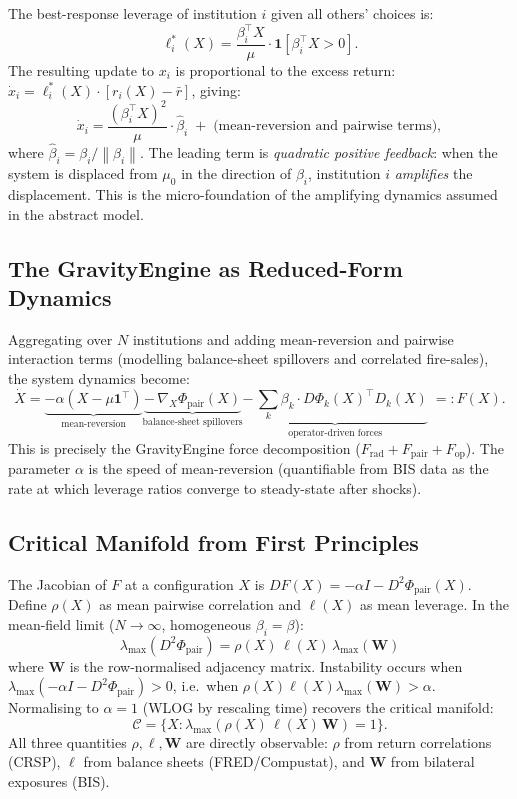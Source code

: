 \documentclass[11pt]{article}
\theoremstyle{definition}
\newcommand{\grad}{\nabla}
\newcommand{\Cman}{\mathcal{C}}
\newcommand{\lmax}{\lambda_{\max}}
\newcommand{\norm}[1]{\left\|#1\right\|}
\begin{document}
The best-response leverage of institution $i$ given all others' choices is:
\[
  \ell_i^*(X) = \frac{\beta_i^\top X}{\mu} \cdot \mathbf{1}[\beta_i^\top X > 0].
\]
The resulting update to $x_i$ is proportional to the excess return:
$\dot x_i = \ell_i^*(X) \cdot [r_i(X) - \bar r]$, giving:
\begin{equation}\label{eq:micro_dynamics}
  \dot x_i = \frac{(\beta_i^\top X)^2}{\mu} \cdot \hat\beta_i
  \;+\; \text{(mean-reversion and pairwise terms)},
\end{equation}
where $\hat\beta_i = \beta_i/\norm{\beta_i}$.
The leading term is \emph{quadratic positive feedback}: when the system is displaced
from $\mu_0$ in the direction of $\beta_i$, institution $i$ \emph{amplifies} the
displacement.  This is the micro-foundation of the amplifying dynamics assumed in
the abstract model.

\subsection{The GravityEngine as Reduced-Form Dynamics}

Aggregating over $N$ institutions and adding mean-reversion and pairwise interaction
terms (modelling balance-sheet spillovers and correlated fire-sales), the system
dynamics become:
\begin{equation}\label{eq:full_dynamics}
  \dot X = \underbrace{-\alpha(X - \mu\mathbf{1}^\top)}_{\text{mean-reversion}}
           \underbrace{-\, \grad_X \Phi_{\mathrm{pair}}(X)}_{\text{balance-sheet spillovers}}
           \underbrace{-\, \sum_k \beta_k \cdot D\Phi_k(X)^\top D_k(X)}_{\text{operator-driven forces}}
           \;=: F(X).
\end{equation}
This is precisely the GravityEngine force decomposition ($F_{\mathrm{rad}} + F_{\mathrm{pair}} + F_{\mathrm{op}}$).
The parameter $\alpha$ is the speed of mean-reversion (quantifiable from BIS data as
the rate at which leverage ratios converge to steady-state after shocks).

\subsection{Critical Manifold from First Principles}

The Jacobian of $F$ at a configuration $X$ is $DF(X) = -\alpha I - D^2\Phi_{\mathrm{pair}}(X)$.
Define $\rho(X)$ as mean pairwise correlation and $\ell(X)$ as mean leverage.
In the mean-field limit ($N \to \infty$, homogeneous $\beta_i = \beta$):
\[
  \lmax(D^2\Phi_{\mathrm{pair}}) = \rho(X)\,\ell(X)\,\lmax(\mathbf{W})
\]
where $\mathbf{W}$ is the row-normalised adjacency matrix.  Instability occurs when
$\lmax(-\alpha I - D^2\Phi_{\mathrm{pair}}) > 0$, i.e.\ when
$\rho(X)\ell(X)\lmax(\mathbf{W}) > \alpha$.
Normalising to $\alpha = 1$ (WLOG by rescaling time) recovers the critical manifold:
\[
  \Cman = \bigl\{X : \lmax(\rho(X)\,\ell(X)\,\mathbf{W}) = 1\bigr\}.
\]
All three quantities $\rho, \ell, \mathbf{W}$ are directly observable: $\rho$ from
return correlations (CRSP), $\ell$ from balance sheets (FRED/Compustat), and
$\mathbf{W}$ from bilateral exposures (BIS).
\end{document}
